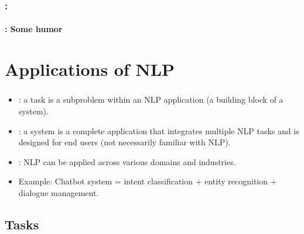 \documentclass[xcolor=table]{beamer}
\begin{document}
\begin{frame}
	\frametitle{\insertshortsubtitle: \insertsection}
	\framesubtitle{\insertsubsection: Some humor}

	\begin{center}
	\end{center}

\end{frame}

\section{Applications of NLP}

\begin{frame}
	\frametitle{\insertshortsubtitle}
	\framesubtitle{\insertsection}
	
	\begin{itemize}
		\item {}: a task is a subproblem within an NLP application (a building block of a system).
		
		\item {}: a system is a complete application that integrates multiple NLP tasks and is designed for end users (not necessarily familiar with NLP).
		
		\item {}: NLP can be applied across various domains and industries.
		
		\item Example: Chatbot system = intent classification + entity recognition + dialogue management.
		
	\end{itemize}
	
\end{frame}


\subsection{Tasks}
\end{document}
